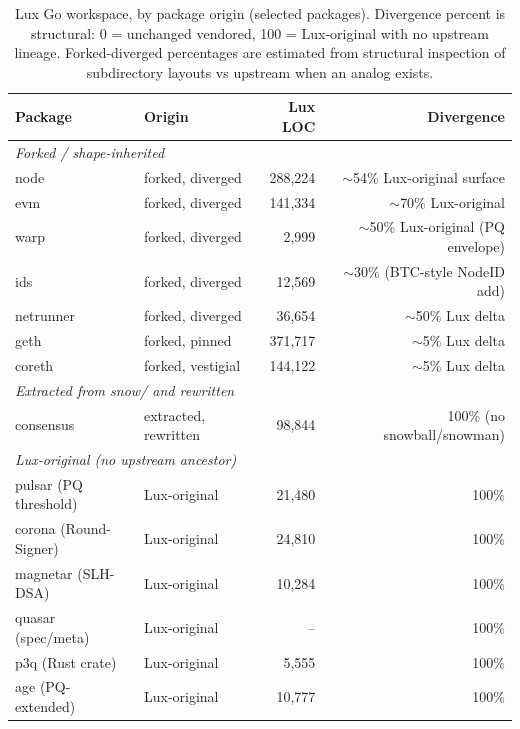 \documentclass[11pt,a4paper]{article}
\begin{document}
\begin{table}[h]
\centering
\small
\caption{Lux Go workspace, by package origin (selected packages).
Divergence percent is structural: 0 = unchanged vendored, 100 =
Lux-original with no upstream lineage. Forked-diverged percentages are
estimated from structural inspection of subdirectory layouts vs upstream
when an analog exists.}
\label{tab:inventory-summary}
\begin{tabular}{l l r r}
\toprule
\textbf{Package} & \textbf{Origin} & \textbf{Lux LOC} & \textbf{Divergence} \\
\midrule
\multicolumn{4}{l}{\textit{Forked / shape-inherited}} \\
node                       & forked, diverged    & 288{,}224 & $\sim$54\% Lux-original surface \\
evm                        & forked, diverged    & 141{,}334 & $\sim$70\% Lux-original \\
warp                       & forked, diverged    & 2{,}999    & $\sim$50\% Lux-original (PQ envelope) \\
ids                        & forked, diverged    & 12{,}569   & $\sim$30\% (BTC-style NodeID add) \\
netrunner                  & forked, diverged    & 36{,}654   & $\sim$50\% Lux delta \\
geth                       & forked, pinned      & 371{,}717  & $\sim$5\% Lux delta \\
coreth                     & forked, vestigial   & 144{,}122  & $\sim$5\% Lux delta \\
\midrule
\multicolumn{4}{l}{\textit{Extracted from snow/ and rewritten}} \\
consensus                  & extracted, rewritten & 98{,}844 & 100\% (no snowball/snowman) \\
\midrule
\multicolumn{4}{l}{\textit{Lux-original (no upstream ancestor)}} \\
pulsar (PQ threshold)      & Lux-original        &  21{,}480 & 100\% \\
corona (Round-Signer)      & Lux-original        &  24{,}810 & 100\% \\
magnetar (SLH-DSA)         & Lux-original        &  10{,}284 & 100\% \\
quasar (spec/meta)         & Lux-original        & --        & 100\% \\
p3q (Rust crate)           & Lux-original        &  5{,}555  & 100\% \\
age (PQ-extended)          & Lux-original        &  10{,}777 & 100\% \\

\end{tabular}
\end{table}
\end{document}
